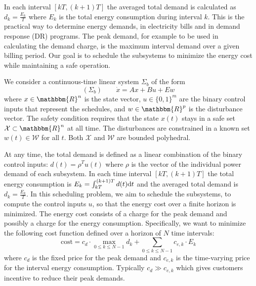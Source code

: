 In each interval $[kT, (k + 1) T]$ the averaged total demand is calculated as $d_k = \frac{E_k}{T}$ where $E_k$ is the total energy consumption during interval $k$.
This is the practical way to determine energy demands, \eg in electricity bills and in demand response (DR) programs.
The peak demand, for example to be used in calculating the demand charge, is the maximum interval demand over a given billing period. %
Our goal is to schedule the subsystems to minimize the energy cost %
while maintaining a safe operation.

We consider a continuous-time linear system $\Sigma_b$ of the form
%
\begin{equation*}
(\Sigma_b) \qquad \dot{x} = Ax + Bu + Ew
\end{equation*}
%
where $x \in \mathbbm{R}^{n}$ is the state vector, $u \in \{ 0, 1 \}^{m}$ are the binary control inputs that represent the schedules, and $w \in \mathbbm{R}^{p}$ is the disturbance vector.
The safety condition requires that the state $x (t)$ stays in a safe set $\mathcal{X} \subset \mathbbm{R}^n$ at all time.
The disturbances are constrained in a known set $w (t) \in \mathcal{W}$ for all $t$.
Both $\mathcal{X}$ and $\mathcal{W}$ are bounded polyhedral.

At any time, the total demand is defined as a linear combination of the binary
control inputs: $d (t) = \rho^T u (t)$ where $\rho$ is the vector of the individual
power demand of each subsystem. In each time interval $[kT, (k + 1) T]$ the
total energy consumption is $E_k = \int_{kT}^{(k + 1) T} d (t) \mathrm{d} t$ and
the averaged total demand is $d_k = \frac{E_k}{T}$. 
In this scheduling problem, we aim to schedule
the subsystems, \ie to compute the control inputs $u$, so that the energy cost over a finite horizon is minimized.
The energy cost consists of a charge for the peak demand and possibly a charge for the energy
consumption.
Specifically, we want to minimize the following cost function defined over a horizon of $N$ time intervals:
\begin{equation}
  \label{eq:cost-function} \text{cost} = c_d \cdot \max_{0 \leqslant k
  \leqslant N - 1} d_k + \textstyle\sum_{0 \leqslant k \leqslant N - 1} c_{e, k} \cdot
  E_k
\end{equation}
where $c_d$ is the fixed price for the peak demand and $c_{e, k}$ is the
time-varying price for the interval energy consumption.
Typically $c_d \gg c_{e, k}$ which gives customers incentive to reduce their peak demands.

